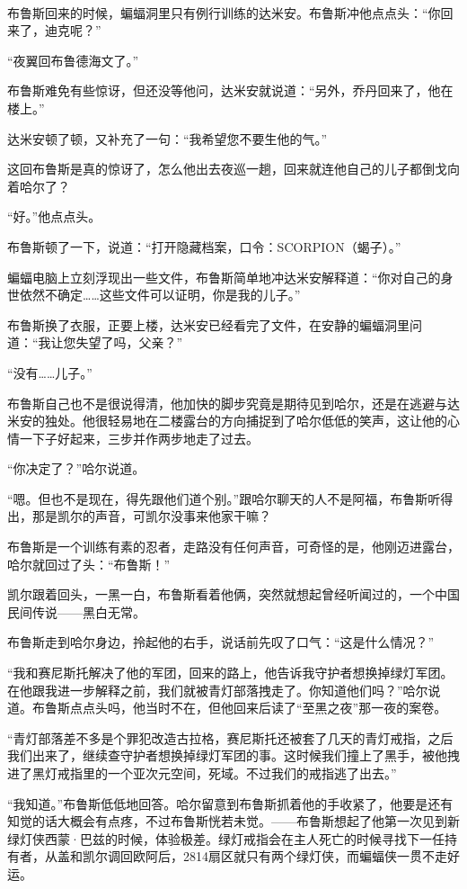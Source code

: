 \documentclass[../main]{subfiles}
\begin{document}
~\

布鲁斯回来的时候，蝙蝠洞里只有例行训练的达米安。布鲁斯冲他点点头：“你回来了，迪克呢？”

“夜翼回布鲁德海文了。”

布鲁斯难免有些惊讶，但还没等他问，达米安就说道：“另外，乔丹回来了，他在楼上。”

达米安顿了顿，又补充了一句：“我希望您不要生他的气。”

这回布鲁斯是真的惊讶了，怎么他出去夜巡一趟，回来就连他自己的儿子都倒戈向着哈尔了？

“好。”他点点头。

布鲁斯顿了一下，说道：“打开隐藏档案，口令：SCORPION（蝎子）。”

蝙蝠电脑上立刻浮现出一些文件，布鲁斯简单地冲达米安解释道：“你对自己的身世依然不确定……这些文件可以证明，你是我的儿子。”

布鲁斯换了衣服，正要上楼，达米安已经看完了文件，在安静的蝙蝠洞里问道：“我让您失望了吗，父亲？”

“没有……儿子。”

布鲁斯自己也不是很说得清，他加快的脚步究竟是期待见到哈尔，还是在逃避与达米安的独处。他很轻易地在二楼露台的方向捕捉到了哈尔低低的笑声，这让他的心情一下子好起来，三步并作两步地走了过去。

“你决定了？”哈尔说道。

“嗯。但也不是现在，得先跟他们道个别。”跟哈尔聊天的人不是阿福，布鲁斯听得出，那是凯尔的声音，可凯尔没事来他家干嘛？

布鲁斯是一个训练有素的忍者，走路没有任何声音，可奇怪的是，他刚迈进露台，哈尔就回过了头：“布鲁斯！”

凯尔跟着回头，一黑一白，布鲁斯看着他俩，突然就想起曾经听闻过的，一个中国民间传说——黑白无常。

布鲁斯走到哈尔身边，拎起他的右手，说话前先叹了口气：“这是什么情况？”

“我和赛尼斯托解决了他的军团，回来的路上，他告诉我守护者想换掉绿灯军团。在他跟我进一步解释之前，我们就被青灯部落拽走了。你知道他们吗？”哈尔说道。布鲁斯点点头吗，他当时不在，但他回来后读了“至黑之夜”那一夜的案卷。

“青灯部落差不多是个罪犯改造古拉格，赛尼斯托还被套了几天的青灯戒指，之后我们出来了，继续查守护者想换掉绿灯军团的事。这时候我们撞上了黑手，被他拽进了黑灯戒指里的一个亚次元空间，死域。不过我们的戒指逃了出去。”

“我知道。”布鲁斯低低地回答。哈尔留意到布鲁斯抓着他的手收紧了，他要是还有知觉的话大概会有点疼，不过布鲁斯恍若未觉。——布鲁斯想起了他第一次见到新绿灯侠西蒙·巴兹的时候，体验极差。绿灯戒指会在主人死亡的时候寻找下一任持有者，从盖和凯尔调回欧阿后，2814扇区就只有两个绿灯侠，而蝙蝠侠一贯不走好运。
\end{document}
